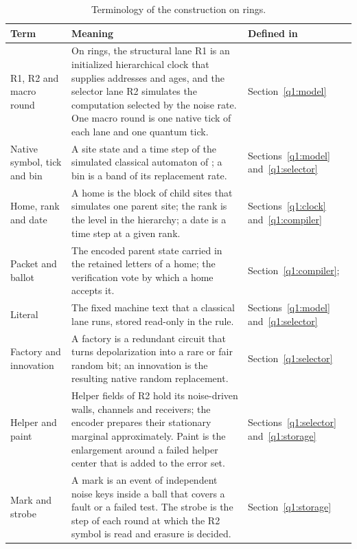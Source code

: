 \begin{table}[!tb]
\caption{Terminology of the construction on rings.}\label{tab:terms-ring}
\small\centering
\begin{tabular}{@{}>{\raggedright\arraybackslash}p{.23\linewidth}>{\raggedright\arraybackslash}p{.51\linewidth}>{\raggedright\arraybackslash}p{.19\linewidth}@{}}
\toprule Term & Meaning & Defined in\\\midrule
R1, R2 and macro round & On rings, the structural lane R1 is an initialized hierarchical clock that supplies addresses and ages, and the selector lane R2 simulates the computation selected by the noise rate. One macro round is one native tick of each lane and one quantum tick. & Section~\ref{q1:model}\\\addlinespace[3pt]
Native symbol, tick and bin & A site state and a time step of the simulated classical automaton of \cite{DMNoise1D2026}; a bin is a band of its replacement rate. & Sections~\ref{q1:model} and~\ref{q1:selector}\\\addlinespace[3pt]
Home, rank and date & A home is the block of child sites that simulates one parent site; the rank is the level in the hierarchy; a date is a time step at a given rank. & Sections~\ref{q1:clock} and~\ref{q1:compiler}\\\addlinespace[3pt]
Packet and ballot & The encoded parent state carried in the retained letters of a home; the verification vote by which a home accepts it. & Section~\ref{q1:compiler}; \cite[Sections~\ref*{cl:sec:packets}--\ref*{cl:sec:verifier}]{DMNoise1D2026}\\\addlinespace[3pt]
Literal & The fixed machine text that a classical lane runs, stored read-only in the rule. & Sections~\ref{q1:model} and~\ref{q1:selector}\\\addlinespace[3pt]
Factory and innovation & A factory is a redundant circuit that turns depolarization into a rare or fair random bit; an innovation is the resulting native random replacement. & Section~\ref{q1:selector}\\\addlinespace[3pt]
Helper and paint & Helper fields of R2 hold its noise-driven walls, channels and receivers; the encoder prepares their stationary marginal approximately. Paint is the enlargement around a failed helper center that is added to the error set. & Sections~\ref{q1:selector} and~\ref{q1:storage}\\\addlinespace[3pt]
Mark and strobe & A mark is an event of independent noise keys inside a ball that covers a fault or a failed test. The strobe is the step of each round at which the R2 symbol is read and erasure is decided. & Section~\ref{q1:storage}\\
\bottomrule
\end{tabular}
\end{table}

